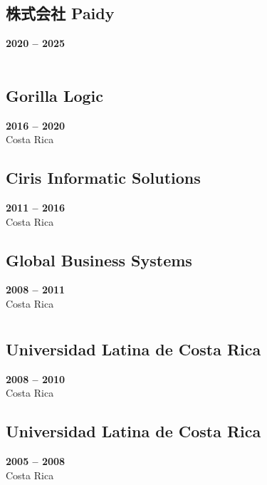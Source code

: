 \documentclass[a4paper,10pt]{article}
\begin{document}
\subsection*{株式会社 Paidy}
\textbf{2020 -- 2025} \\ 
\textcolor{secondary}{\japan} \\
\emph{\softDevSeniorScala}
\paidyText

\subsection*{Gorilla Logic}
\textbf{2016 -- 2020} \\
\textcolor{secondary}{Costa Rica} \\
\emph{\gorillaTitle}
\gorillaText

\subsection*{Ciris Informatic Solutions}
\textbf{2011 -- 2016} \\
\textcolor{secondary}{Costa Rica} \\
\emph{\cirisTitle}
\cirisText

\subsection*{Global Business Systems}
\textbf{2008 -- 2011} \\
\textcolor{secondary}{Costa Rica} \\
\emph{\gbsysTitle}
\gbsysText

\section*{\textcolor{primary}{\educacion}}
\subsection*{Universidad Latina de Costa Rica}
\textbf{2008 -- 2010} \\
\textcolor{secondary}{Costa Rica} \\
\emph{\licenciaturaTitle}
\licenciaturaText

\subsection*{Universidad Latina de Costa Rica}
\textbf{2005 -- 2008} \\
\textcolor{secondary}{Costa Rica} \\
\emph{\bachilleratorTitle}
\bachilleratorText
\end{document}
